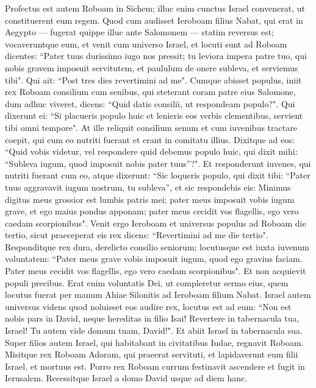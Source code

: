 \begin{biblechapter}  
\verse Profectus est autem Roboam in Sichem; illuc enim cunctus Israel convenerat, ut constituerent eum regem. 
\verse Quod cum audisset Ieroboam filius Nabat, qui erat in Aegypto — fugerat quippe illuc ante Salomonem — statim reversus est; 
\verse vocaveruntque eum, et venit cum universo Israel, et locuti sunt ad Roboam dicentes: 
\verse “Pater tuus durissimo iugo nos pressit; tu leviora impera patre tuo, qui nobis gravem imposuit servitutem, et paululum de onere subleva, et serviemus tibi". 
\verse Qui ait: “Post tres dies revertimini ad me". Cumque abisset populus, 
\verse iniit rex Roboam consilium cum senibus, qui steterant coram patre eius Salomone, dum adhuc viveret, dicens: “Quid datis consilii, ut respondeam populo?". 
\verse Qui dixerunt ei: “Si placueris populo huic et lenieris eos verbis clementibus, servient tibi omni tempore". 
\verse At ille reliquit consilium senum et cum iuvenibus tractare coepit, qui cum eo nutriti fuerant et erant in comitatu illius. 
\verse Dixitque ad eos: “Quid vobis videtur, vel respondere quid debemus populo huic, qui dixit mihi: “Subleva iugum, quod imposuit nobis pater tuus”?". 
\verse Et responderunt iuvenes, qui nutriti fuerant cum eo, atque dixerunt: “Sic loqueris populo, qui dixit tibi: “Pater tuus aggravavit iugum nostrum, tu subleva”, et sic respondebis eis: Minimus digitus meus grossior est lumbis patris mei; 
\verse pater meus imposuit vobis iugum grave, et ego maius pondus apponam; pater meus cecidit vos flagellis, ego vero caedam scorpionibus". 
\verse Venit ergo Ieroboam et universus populus ad Roboam die tertio, sicut praeceperat eis rex dicens: “Revertimini ad me die tertio". 
\verse Responditque rex dura, derelicto consilio seniorum; 
\verse locutusque est iuxta iuvenum voluntatem: “Pater meus grave vobis imposuit iugum, quod ego gravius faciam. Pater meus cecidit vos flagellis, ego vero caedam scorpionibus". 
\verse Et non acquievit populi precibus. Erat enim voluntatis Dei, ut compleretur sermo eius, quem locutus fuerat per manum Ahiae Silonitis ad Ieroboam filium Nabat. 
\verse Israel autem universus videns quod noluisset eos audire rex, locutus est ad eum: “Non est nobis pars in David, neque hereditas in filio Isai! Revertere in tabernacula tua, Israel! Tu autem vide domum tuam, David!". Et abiit Israel in tabernacula sua. 
\verse Super filios autem Israel, qui habitabant in civitatibus Iudae, regnavit Roboam. 
\verse Misitque rex Roboam Adoram, qui praeerat servituti, et lapidaverunt eum filii Israel, et mortuus est. Porro rex Roboam currum festinavit ascendere et fugit in Ierusalem. 
\verse Recessitque Israel a domo David usque ad diem hanc. 
\end{biblechapter}

